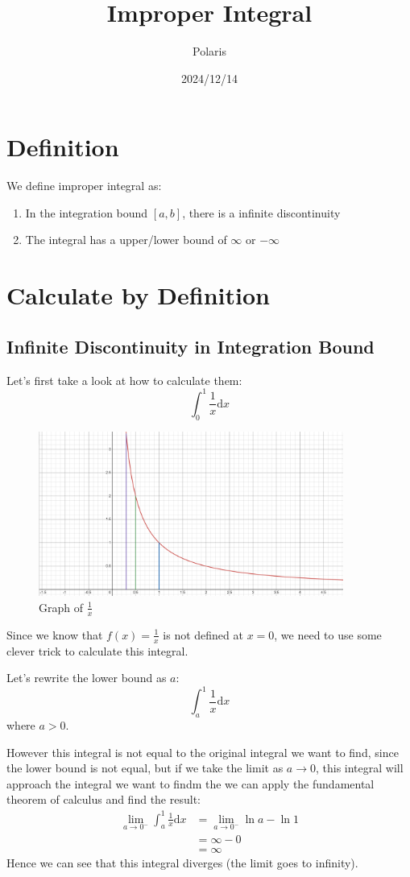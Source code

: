 \documentclass{article}
\title{Improper Integral}
\author{Polaris}
\date{2024/12/14}
\begin{document}
\maketitle

\section{Definition}
We define improper integral as:
\begin{enumerate}
    \item In the integration bound $[a,b]$, there is a infinite discontinuity
    \item The integral has a upper/lower bound of $\infty$ or $-\infty$
\end{enumerate}

\section{Calculate by Definition}
\subsection{Infinite Discontinuity in Integration Bound}
Let's first take a look at how to calculate them:
\begin{equation}
    \int_0^1 \frac{1}{x}\mathrm{d}x
\end{equation}

\begin{figure}[H]
    \includegraphics[width = 10cm]{pictures/improperintegral1.png}
    \centering
    \caption{Graph of $\frac{1}{x}$}
\end{figure}
Since we know that $f(x) = \frac{1}{x}$ is not defined at $x=0$, we need to use some clever trick to calculate this integral.

Let's rewrite the lower bound as $a$:
\[
    \int_a^1\frac{1}{x}\mathrm{d}x
\]
where $a>0$.

\newpage
However this integral is not equal to the original integral we want to find, since the lower bound is not equal,
but if we take the limit as $a\to 0$, this integral will approach the integral we want to findm the we can apply the fundamental theorem of calculus and find the result:
\[
    \begin{split}
        \lim_{a\to 0^-} \int_{a}^{1}\frac{1}{x}\mathrm{d}x &= \lim_{a\to 0^-}\ln a - \ln 1 \\
        & = \infty - 0 \\
        & = \infty
    \end{split}
\]
Hence we can see that this integral diverges (the limit goes to infinity).
\end{document}

